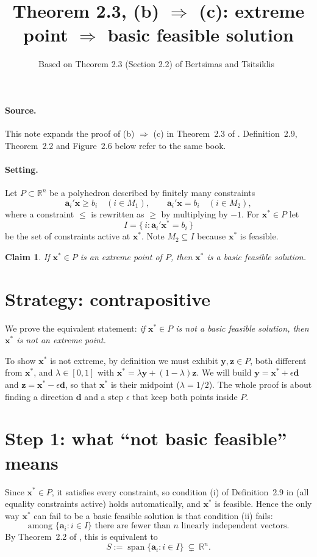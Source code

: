 \documentclass[11pt]{article}
\title{Theorem 2.3, (b) $\Rightarrow$ (c): extreme point $\Rightarrow$ basic feasible solution}
\author{}
\date{Based on Theorem 2.3 (Section 2.2) of Bertsimas and Tsitsiklis~\cite{BT97}}
\newtheorem*{claim}{Claim}
\theoremstyle{remark}
\begin{document}
\maketitle

\paragraph{Source.} This note expands the proof of (b) $\Rightarrow$ (c) in Theorem~2.3 of \cite[Section~2.2]{BT97}. Definition~2.9, Theorem~2.2 and Figure~2.6 below refer to the same book.

\paragraph{Setting.}
Let $P\subset\mathbb{R}^n$ be a polyhedron described by finitely many constraints
\[
\mathbf a_i'\mathbf x \ge b_i \quad (i\in M_1), \qquad
\mathbf a_i'\mathbf x = b_i \quad (i\in M_2),
\]
where a constraint $\le$ is rewritten as $\ge$ by multiplying by $-1$. For $\mathbf x^*\in P$ let
\[
I=\{\, i : \mathbf a_i'\mathbf x^* = b_i \,\}
\]
be the set of constraints active at $\mathbf x^*$. Note $M_2\subseteq I$ because $\mathbf x^*$ is feasible.

\begin{claim}
If $\mathbf x^*\in P$ is an extreme point of $P$, then $\mathbf x^*$ is a basic feasible solution.
\end{claim}

\section*{Strategy: contrapositive}
We prove the equivalent statement: \emph{if $\mathbf x^*\in P$ is not a basic feasible solution, then $\mathbf x^*$ is not an extreme point.}

To show $\mathbf x^*$ is not extreme, by definition we must exhibit $\mathbf y,\mathbf z\in P$, both different from $\mathbf x^*$, and $\lambda\in[0,1]$ with $\mathbf x^*=\lambda\mathbf y+(1-\lambda)\mathbf z$. We will build $\mathbf y=\mathbf x^*+\epsilon\mathbf d$ and $\mathbf z=\mathbf x^*-\epsilon\mathbf d$, so that $\mathbf x^*$ is their midpoint ($\lambda=1/2$). The whole proof is about finding a direction $\mathbf d$ and a step $\epsilon$ that keep both points inside $P$.

\section*{Step 1: what ``not basic feasible'' means}
Since $\mathbf x^*\in P$, it satisfies every constraint, so condition (i) of Definition~2.9 in \cite{BT97} (all equality constraints active) holds automatically, and $\mathbf x^*$ is feasible. Hence the only way $\mathbf x^*$ can fail to be a basic feasible solution is that condition (ii) fails:
\[
\text{among } \{\mathbf a_i : i\in I\} \text{ there are fewer than } n \text{ linearly independent vectors.}
\]
By Theorem~2.2 of \cite{BT97}, this is equivalent to
\[
S:=\operatorname{span}\{\mathbf a_i : i\in I\}\ \subsetneq\ \mathbb{R}^n .
\]
\end{document}
